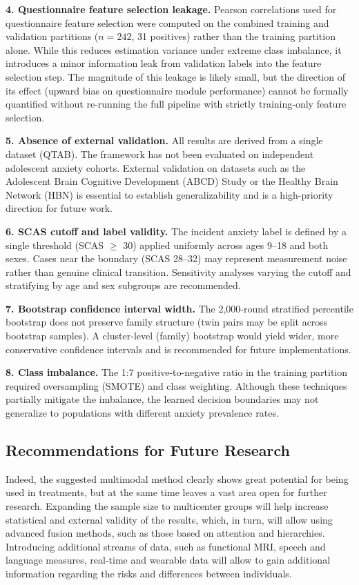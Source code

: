 \documentclass[10pt,letterpaper]{article}
\newcommand{\hlpar}[1]{\leavevmode\colorbox{yellow!30}{\parbox{\dimexpr\linewidth-2\fboxsep\relax}{#1}}\vspace{2pt}}
\begin{document}
\hlpar{\textbf{4. Questionnaire feature selection leakage.} Pearson correlations used for questionnaire feature selection were computed on the combined training and validation partitions ($n = 242$, 31 positives) rather than the training partition alone. While this reduces estimation variance under extreme class imbalance, it introduces a minor information leak from validation labels into the feature selection step. The magnitude of this leakage is likely small, but the direction of its effect (upward bias on questionnaire module performance) cannot be formally quantified without re-running the full pipeline with strictly training-only feature selection.}

\hlpar{\textbf{5. Absence of external validation.} All results are derived from a single dataset (QTAB). The framework has not been evaluated on independent adolescent anxiety cohorts. External validation on datasets such as the Adolescent Brain Cognitive Development (ABCD) Study or the Healthy Brain Network (HBN) is essential to establish generalizability and is a high-priority direction for future work.}
\hlpar{\textbf{6. SCAS cutoff and label validity.} The incident anxiety label is defined by a single threshold (SCAS $\geq$ 30) applied uniformly across ages 9--18 and both sexes. Cases near the boundary (SCAS 28--32) may represent measurement noise rather than genuine clinical transition. Sensitivity analyses varying the cutoff and stratifying by age and sex subgroups are recommended.}
\hlpar{\textbf{7. Bootstrap confidence interval width.} The 2{,}000-round stratified percentile bootstrap does not preserve family structure (twin pairs may be split across bootstrap samples). A cluster-level (family) bootstrap would yield wider, more conservative confidence intervals and is recommended for future implementations.}

\hlpar{\textbf{8. Class imbalance.} The 1:7 positive-to-negative ratio in the training partition required oversampling (SMOTE) and class weighting. Although these techniques partially mitigate the imbalance, the learned decision boundaries may not generalize to populations with different anxiety prevalence rates.}

\subsection*{Recommendations for Future Research}
Indeed, the suggested multimodal method clearly shows great potential for being used in treatments, but at the same time leaves a vast area open for further research. Expanding the sample size to multicenter groups will help increase statistical and external validity of the results, which, in turn, will allow using advanced fusion methods, such as those based on attention and hierarchies. Introducing additional streams of data, such as functional MRI, speech and language measures, real-time and wearable data will allow to gain additional information regarding the risks and differences between individuals.
\end{document}
